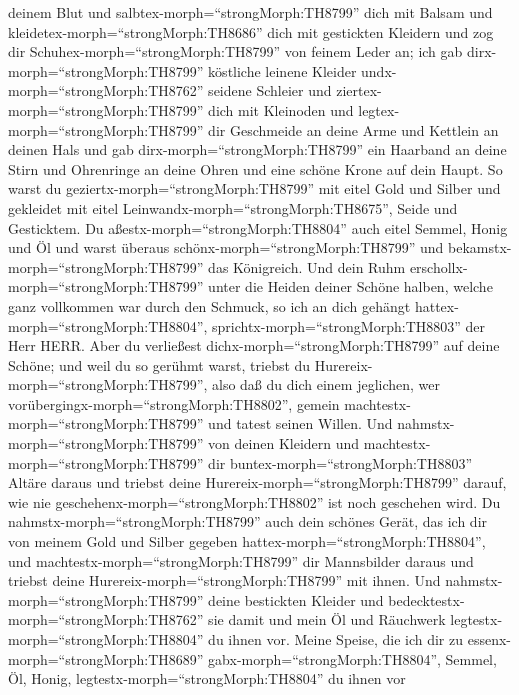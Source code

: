 deinem Blut und salbtex-morph=``strongMorph:TH8799'' dich mit Balsam
 und kleidetex-morph=``strongMorph:TH8686'' dich mit
gestickten Kleidern und zog dir Schuhex-morph=``strongMorph:TH8799'' von
feinem Leder an; ich gab dirx-morph=``strongMorph:TH8799'' köstliche
leinene Kleider undx-morph=``strongMorph:TH8762'' seidene Schleier
 und ziertex-morph=``strongMorph:TH8799'' dich mit
Kleinoden und legtex-morph=``strongMorph:TH8799'' dir Geschmeide an
deine Arme und Kettlein an deinen Hals  und gab
dirx-morph=``strongMorph:TH8799'' ein Haarband an deine Stirn und
Ohrenringe an deine Ohren und eine schöne Krone auf dein Haupt.
 So warst du geziertx-morph=``strongMorph:TH8799'' mit
eitel Gold und Silber und gekleidet mit eitel
Leinwandx-morph=``strongMorph:TH8675'', Seide und Gesticktem. Du
aßestx-morph=``strongMorph:TH8804'' auch eitel Semmel, Honig und Öl und
warst überaus schönx-morph=``strongMorph:TH8799'' und
bekamstx-morph=``strongMorph:TH8799'' das Königreich.  Und
dein Ruhm erschollx-morph=``strongMorph:TH8799'' unter die Heiden deiner
Schöne halben, welche ganz vollkommen war durch den Schmuck, so ich an
dich gehängt hattex-morph=``strongMorph:TH8804'',
sprichtx-morph=``strongMorph:TH8803'' der Herr HERR.  Aber
du verließest dichx-morph=``strongMorph:TH8799'' auf deine Schöne; und
weil du so gerühmt warst, triebst du
Hurereix-morph=``strongMorph:TH8799'', also daß du dich einem jeglichen,
wer vorübergingx-morph=``strongMorph:TH8802'', gemein
machtestx-morph=``strongMorph:TH8799'' und tatest seinen Willen.
 Und nahmstx-morph=``strongMorph:TH8799'' von deinen
Kleidern und machtestx-morph=``strongMorph:TH8799'' dir
buntex-morph=``strongMorph:TH8803'' Altäre daraus und triebst deine
Hurereix-morph=``strongMorph:TH8799'' darauf, wie nie
geschehenx-morph=``strongMorph:TH8802'' ist noch geschehen wird.
 Du nahmstx-morph=``strongMorph:TH8799'' auch dein schönes
Gerät, das ich dir von meinem Gold und Silber gegeben
hattex-morph=``strongMorph:TH8804'', und
machtestx-morph=``strongMorph:TH8799'' dir Mannsbilder daraus und
triebst deine Hurereix-morph=``strongMorph:TH8799'' mit ihnen.
 Und nahmstx-morph=``strongMorph:TH8799'' deine bestickten
Kleider und bedecktestx-morph=``strongMorph:TH8762'' sie damit und mein
Öl und Räuchwerk legtestx-morph=``strongMorph:TH8804'' du ihnen vor.
 Meine Speise, die ich dir zu
essenx-morph=``strongMorph:TH8689'' gabx-morph=``strongMorph:TH8804'',
Semmel, Öl, Honig, legtestx-morph=``strongMorph:TH8804'' du ihnen vor
